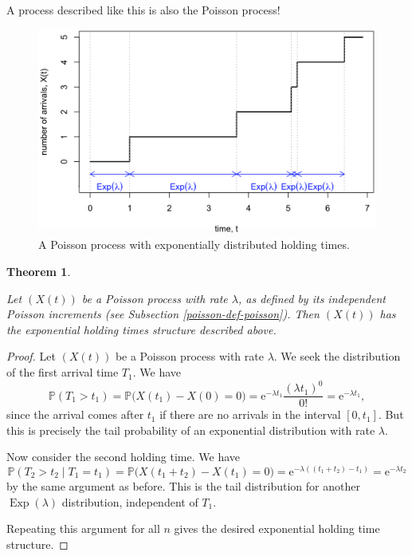 \documentclass[
  a4paper,
]{article}
\newtheorem{theorem}{Theorem}[section]
\theoremstyle{definition}
\theoremstyle{definition}
\theoremstyle{definition}
\theoremstyle{remark}
\begin{document}
A process described like this is also the Poisson process!

\begin{figure}
\centering
\includegraphics{sections/pois-exp-pic.png}
\caption{\label{fig:pois-exp-pic}A Poisson process with exponentially distributed holding times.}
\end{figure}

\begin{theorem}
\protect\hypertarget{thm:pois-exp-equiv}{}\label{thm:pois-exp-equiv}

Let \((X(t))\) be a Poisson process with rate \(\lambda\), as defined by its independent Poisson increments (see Subsection \ref{poisson-def-poisson}). Then \((X(t))\) has the exponential holding times structure described above.

\end{theorem}

\begin{proof}

Let \((X(t))\) be a Poisson process with rate \(\lambda\). We seek the distribution of the first arrival time \(T_1\). We have
\[ \mathbb P(T_1 > t_1) = \mathbb P\big(X(t_1) - X(0) = 0\big) = \mathrm{e}^{-\lambda t_1} \frac{(\lambda t_1)^0}{0!} = \mathrm{e}^{-\lambda t_1} , \]
since the arrival comes after \(t_1\) if there are no arrivals in the interval \([0,t_1]\).
But this is precisely the tail probability of an exponential distribution with rate \(\lambda\).

Now consider the second holding time. We have
\[ \mathbb P(T_2 > t_2 \mid T_1 = t_1) = \mathbb P\big(X(t_1 + t_2) - X(t_1) = 0\big) = \mathrm{e}^{-\lambda ((t_1 + t_2) - t_1)}  =  \mathrm{e}^{-\lambda t_2} \]
by the same argument as before. This is the tail distribution for another \(\operatorname{Exp}(\lambda)\) distribution, independent of \(T_1\).

Repeating this argument for all \(n\) gives the desired exponential holding time structure.

\end{proof}
\end{document}
